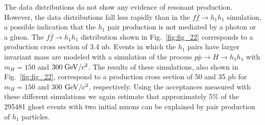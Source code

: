\documentclass[twocolumn,10pt,prl,preprint,floatfix,nofootinbib,superscriptaddress,showpacs,amssymb]{revtex4}
\begin{document}
 The data distributions do not show any evidence of resonant production.
 However, the data distributions fall less rapidly than in the
 $f\bar{f} \rightarrow h_1 h_1$ simulation, a possible indication that the 
 $h_1$ pair production is not mediated by a photon or a gluon.
 The $f\bar{f} \rightarrow h_1 h_1$ distribution shown in Fig.~\ref{fig:fig_22}
 corresponds to a production cross section of 3.4 nb. Events in which the
 $h_1$ pairs have larger invariant mass are modeled with a simulation of 
 the process $p\bar{p} \rightarrow H \rightarrow h_1 h_1$ with $m_H=150$
 and $300 \; {\rm GeV/}c^2$. The results of these simulations, also shown in
 Fig.~\ref{fig:fig_22}, correspond to a production cross section of 50 and
 35 pb for $m_H=150$ and 300 ${\rm GeV/}c^2$, respectively.
 Using the acceptances measured with these different simulations we again
 estimate that approximately 5\% of the 295481 ghost events with two initial
 muons can be explained by pair production of $h_1$ particles.
\end{document}
